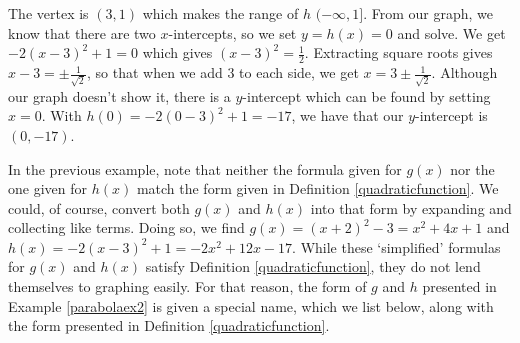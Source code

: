 {\begin{enumerate}




The vertex is $(3,1)$ which makes the range of $h$ $(-\infty, 1]$.  From our graph, we know that there are two $x$-intercepts, so we set $y = h(x) = 0$ and solve.  We get $-2(x-3)^2+1 = 0$ which gives $(x-3)^2 = \frac{1}{2}$.  Extracting square roots gives $x - 3 = \pm \frac{1}{\sqrt{2}}$, so that when we add $3$ to each side,  we get $x = 3\pm \frac{1}{\sqrt{2}}$.   Although our graph doesn't show it, there is a $y$-intercept which can be found by setting $x=0$.  With $h(0) = -2(0-3)^2+1 = -17$, we have that our $y$-intercept is $(0,-17)$. 
\end{enumerate}
}

\medskip

In the previous example, note that neither the formula given for $g(x)$ nor the one given for $h(x)$ match the form given in Definition \ref{quadraticfunction}. We could, of course, convert both $g(x)$ and $h(x)$ into that form by expanding and collecting like terms. Doing so, we find $g(x) = (x+2)^2 - 3 = x^2 + 4x+1$ and  $h(x) = -2(x-3)^2+1 = -2x^2+12x-17$.  While these `simplified' formulas for $g(x)$ and $h(x)$ satisfy  Definition \ref{quadraticfunction}, they do not lend themselves to graphing easily.  For that reason, the form of $g$ and $h$ presented in Example \ref{parabolaex2} is given a special name, which we list below, along with the form presented in  Definition \ref{quadraticfunction}.


\smallskip


